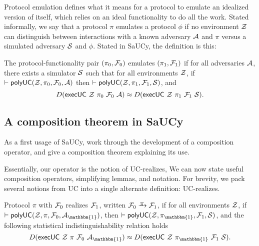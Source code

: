 Protocol emulation defines what it means for a protocol to emulate an idealized
version of itself, which relies on an ideal functionality to do all the
work. Stated informally, we say that a protocol $\pi$ emulates a protocol $\phi$ if no
environment $\mathcal{{Z}}$ can distinguish between interactions with a known adversary
$\mathcal{{A}}$ and $\pi$ versus a simulated adversary $\mathcal{{S}}$ and $\phi$. Stated in SaUCy,
the definition is this:
\begin{definition}[Emulation]
  The protocol-functionality pair $(\pi_0, \mathcal{{F}}_0)$ emulates $(\pi_1, \mathcal{{F}}_1)$
  if for all adversaries $\mathcal{{A}}$, there exists a simulator $\mathcal{{S}}$
  such that for all environments $\mathcal{{Z}}$, if $|- \text{\textsf{polyUC}}(\mathcal{{Z}}, \pi_0,
  \mathcal{{F}}_0, \mathcal{{A}})$ then $|- \text{\textsf{polyUC}}(\mathcal{{Z}}, \pi_1, \mathcal{{F}}_1, \mathcal{{S}})$,
  and
  \[ D(\mathsf{execUC}\ \mc{Z}\ \pi_0\ \mc{F}_0\ \mc{A}) \approx D(\mathsf{execUC}\ \mc{Z}\ \pi_1\ \mc{F}_1\ \mc{S}).\]
\end{definition}

\subsection{A composition theorem in SaUCy}
\label{subsec:composition}

As a first usage of SaUCy,
work through the development of a composition operator, and give a composition
theorem explaining its use.


Essentially, our operator is the notion of UC-realizes,
We can now state useful composition operators, simplifying lemmas, and
notation. For brevity, we pack several notions from UC into a single alternate
definition: UC-realizes.

\begin{definition}[UC-realizes]
  Protocol $\pi$ with $\mathcal{{F}}_0$ realizes $\mathcal{{F}}_1$, written $\mc{F}_0
  \yrightarrow{$\pi$} \mc{F}_1$, if for all environments $\mathcal{{Z}}$, if $|-
  \keyword{polyUC}(\mc{Z}, \pi, \mc{F}_0, \mc{A}_{\mathbbm{1}})$, then
  $|- \keyword{polyUC}(\mc{Z}, \pi_{\mathbbm{1}}, \mc{F}_1, \mc{S})$, and the
  following statistical indistinguishability relation holds
  \[ D(\mathsf{execUC}\ \mc{Z}\ \pi\ \mc{F}_0\ \mc{A}_{\mathbbm{1}}) \approx D(\mathsf{execUC}\ \mc{Z}\ \pi_{\mathbbm{1}}\ \mc{F}_1\ \mc{S}).\]
\end{definition}

